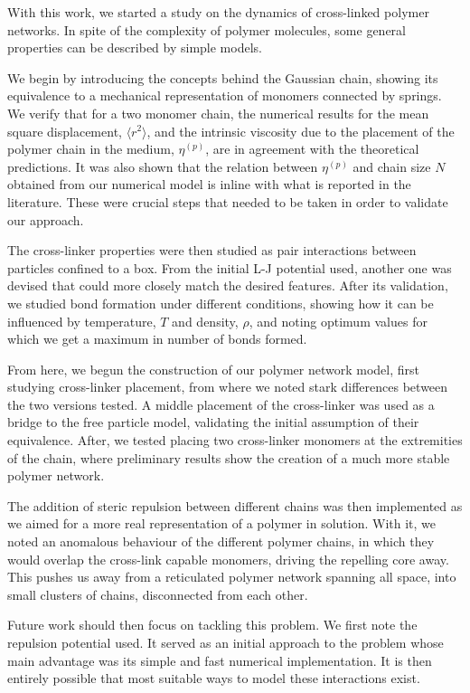 \documentclass[../../main.tex]{subfiles}
\begin{document}
%
    With this work, we started a study on the dynamics of cross-linked polymer networks. In spite of the complexity of polymer molecules, some general properties can be described by simple models. 
    
    We begin by introducing the concepts behind the Gaussian chain, showing its equivalence to a mechanical representation of monomers connected by springs. We verify that for a two monomer chain, the numerical results for the mean square displacement, $\langle r^2 \rangle$, and the intrinsic viscosity due to the placement of the polymer chain in the medium, $\eta^{(p)}$, are in agreement with the theoretical predictions. It was also shown that the relation between $\eta^{(p)}$ and chain size $N$ obtained from our numerical model is inline with what is reported in the literature. These were crucial steps that needed to be taken in order to validate our approach.
    
    The cross-linker properties were then studied as pair interactions between particles confined to a box. From the initial L-J potential used, another one was devised that could more closely match the desired features. After its validation, we studied bond formation under different conditions, showing how it can be influenced by temperature, $T$ and density, $\rho$, and noting optimum values for which we get a maximum in number of bonds formed.
    
    From here, we begun the construction of our polymer network model, first studying cross-linker placement, from where we noted stark differences between the two versions tested. A middle placement of the cross-linker was used as a bridge to the free particle model, validating the initial assumption of their equivalence. After, we tested placing two cross-linker monomers at the extremities of the chain, where preliminary results show the creation of a much more stable polymer network.
    
    The addition of steric repulsion between different chains was then implemented as we aimed for a more real representation of a polymer in solution. With it, we noted an anomalous behaviour of the different polymer chains, in which they would overlap the cross-link capable monomers, driving the repelling core away. This pushes us away from a reticulated polymer network spanning all space, into small clusters of chains, disconnected from each other. 
    
    Future work should then focus on tackling this problem. We first note the repulsion potential used. It served as an initial approach to the problem whose main advantage was its simple and fast numerical implementation. It is then entirely possible that most suitable ways to model these interactions exist.
    
\end{document}
